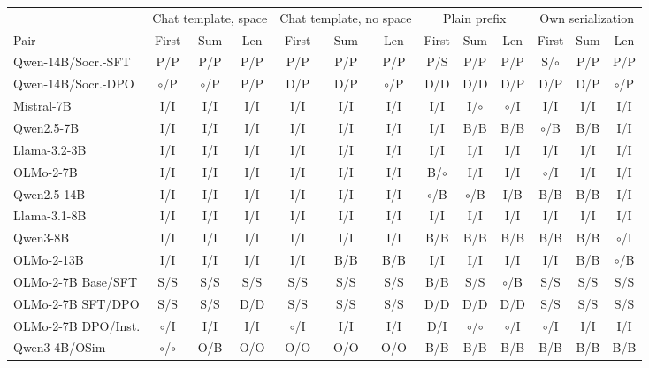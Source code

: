 \begin{table}[t]
\centering\scriptsize
\setlength{\tabcolsep}{3.5pt}
\begin{tabular}{@{}lccc@{\hspace{6pt}}ccc@{\hspace{6pt}}ccc@{\hspace{6pt}}ccc@{}}
\toprule
& \multicolumn{3}{c}{Chat template, space} & \multicolumn{3}{c}{Chat template, no space} & \multicolumn{3}{c}{Plain prefix} & \multicolumn{3}{c}{Own serialization} \\
\cmidrule(lr){2-4}\cmidrule(lr){5-7}\cmidrule(lr){8-10}\cmidrule(l){11-13}
Pair & First & Sum & Len & First & Sum & Len & First & Sum & Len & First & Sum & Len \\
\midrule
Qwen-14B/Socr.-SFT & P/P & P/P & P/P & P/P & P/P & P/P & P/S & P/P & P/P & S/$\circ$ & P/P & P/P \\
Qwen-14B/Socr.-DPO & $\circ$/P & $\circ$/P & P/P & D/P & D/P & $\circ$/P & D/D & D/D & D/P & D/P & D/P & $\circ$/P \\
Mistral-7B & I/I & I/I & I/I & I/I & I/I & I/I & I/I & I/$\circ$ & $\circ$/I & I/I & I/I & I/I \\
Qwen2.5-7B & I/I & I/I & I/I & I/I & I/I & I/I & I/I & B/B & B/B & $\circ$/B & B/B & I/I \\
Llama-3.2-3B & I/I & I/I & I/I & I/I & I/I & I/I & I/I & I/I & I/I & I/I & I/I & I/I \\
OLMo-2-7B & I/I & I/I & I/I & I/I & I/I & I/I & B/$\circ$ & I/I & I/I & $\circ$/I & I/I & I/I \\
Qwen2.5-14B & I/I & I/I & I/I & I/I & I/I & I/I & $\circ$/B & $\circ$/B & I/B & B/B & B/B & I/I \\
Llama-3.1-8B & I/I & I/I & I/I & I/I & I/I & I/I & I/I & I/I & I/I & I/I & I/I & I/I \\
Qwen3-8B & I/I & I/I & I/I & I/I & I/I & I/I & B/B & B/B & B/B & B/B & B/B & $\circ$/I \\
OLMo-2-13B & I/I & I/I & I/I & I/I & B/B & B/B & I/I & I/I & I/I & I/I & B/B & $\circ$/B \\
OLMo-2-7B Base/SFT & S/S & S/S & S/S & S/S & S/S & S/S & B/B & S/S & $\circ$/B & S/S & S/S & S/S \\
OLMo-2-7B SFT/DPO & S/S & S/S & D/D & S/S & S/S & S/S & D/D & D/D & D/D & S/S & S/S & S/S \\
OLMo-2-7B DPO/Inst. & $\circ$/I & I/I & I/I & $\circ$/I & I/I & I/I & D/I & $\circ$/$\circ$ & $\circ$/I & $\circ$/I & I/I & I/I \\
Qwen3-4B/OSim & $\circ$/$\circ$ & O/B & O/O & O/O & O/O & O/O & B/B & B/B & B/B & B/B & B/B & B/B \\

\end{tabular}
\end{table}
